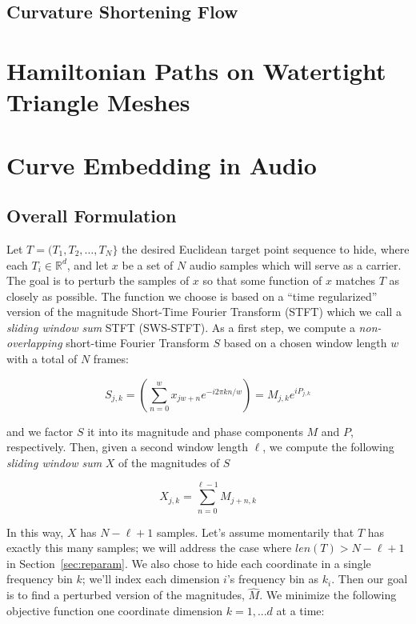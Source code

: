 \documentclass[runningheads]{llncs}
\begin{document}
\subsection{Curvature Shortening Flow}


\section{Hamiltonian Paths on Watertight Triangle Meshes}



\section{Curve Embedding in Audio}

\subsection{Overall Formulation}

Let $T = (T_1, T_2, \hdots, T_N \}$ the desired Euclidean target point sequence to hide, where each $T_i \in \mathbb{R}^d$, and let $x$ be a set of $N$ audio samples which will serve as a carrier.  The goal is to perturb the samples of $x$ so that some function of $x$ matches $T$ as closely as possible.  The function we choose is based on a ``time regularized'' version of the magnitude Short-Time Fourier Transform (STFT) which we call a {\em sliding window sum} STFT (SWS-STFT).  As a first step, we compute a {\em non-overlapping} short-time Fourier Transform $S$ based on a chosen window length $w$ with a total of $N$ frames:

\begin{equation}
  S_{j, k} = \left( \sum_{n = 0}^w x_{jw + n} e^{-i 2 \pi k n / w} \right) = M_{j, k} e^{i P_{j, k}}
\end{equation}

and we factor $S$ it into its magnitude and phase components $M$ and $P$, respectively.  Then, given a second window length $\ell$, we compute the following {\em sliding window sum} $X$ of the magnitudes of $S$

\begin{equation}
  X_{j, k} = \sum_{n = 0}^{\ell-1} M_{j+n, k}
\end{equation}

In this way, $X$ has $N-\ell+1$ samples.  Let's assume momentarily that $T$ has exactly this many samples; we will address the case where $len(T) > N-\ell+1$ in Section~\ref{sec:reparam}.  We also chose to hide each coordinate in a single frequency bin $k$; we'll index each dimension $i$'s frequency bin as $k_i$.  Then our goal is to find a perturbed version of the magnitudes, $\hat{M}$.  We minimize the following objective function one coordinate dimension $k = 1, ... d$ at a time:
\end{document}
